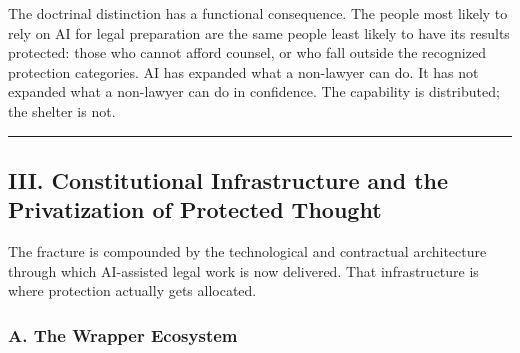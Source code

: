 \documentclass[
  12pt,
]{article}
\begin{document}
The doctrinal distinction has a functional consequence. The people most
likely to rely on AI for legal preparation are the same people least
likely to have its results protected: those who cannot afford counsel,
or who fall outside the recognized protection categories. AI has
expanded what a non-lawyer can do. It has not expanded what a non-lawyer
can do in confidence. The capability is distributed; the shelter is not.

\begin{center}\rule{0.5\linewidth}{0.5pt}\end{center}

\subsection{III. Constitutional Infrastructure and the Privatization of
Protected
Thought}\label{iii-constitutional-infrastructure-and-the-privatization-of-protected-thought}

The fracture is compounded by the technological and contractual
architecture through which AI-assisted legal work is now delivered. That
infrastructure is where protection actually gets allocated.

\subsubsection{A. The Wrapper Ecosystem}\label{a-the-wrapper-ecosystem}
\end{document}

